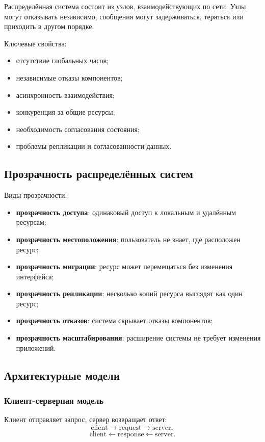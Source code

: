 \documentclass[12pt,a4paper]{article}
\begin{document}
Распределённая система состоит из узлов, взаимодействующих по сети. Узлы могут отказывать независимо, сообщения могут задерживаться, теряться или приходить в другом порядке.

Ключевые свойства:
\begin{itemize}
    \item отсутствие глобальных часов;
    \item независимые отказы компонентов;
    \item асинхронность взаимодействия;
    \item конкуренция за общие ресурсы;
    \item необходимость согласования состояния;
    \item проблемы репликации и согласованности данных.
\end{itemize}

\subsection{Прозрачность распределённых систем}

Виды прозрачности:
\begin{itemize}
    \item \textbf{прозрачность доступа}: одинаковый доступ к локальным и удалённым ресурсам;
    \item \textbf{прозрачность местоположения}: пользователь не знает, где расположен ресурс;
    \item \textbf{прозрачность миграции}: ресурс может перемещаться без изменения интерфейса;
    \item \textbf{прозрачность репликации}: несколько копий ресурса выглядят как один ресурс;
    \item \textbf{прозрачность отказов}: система скрывает отказы компонентов;
    \item \textbf{прозрачность масштабирования}: расширение системы не требует изменения приложений.
\end{itemize}

\subsection{Архитектурные модели}

\subsubsection{Клиент-серверная модель}

Клиент отправляет запрос, сервер возвращает ответ:
\[
\text{client} \rightarrow \text{request} \rightarrow \text{server},
\]
\[
\text{client} \leftarrow \text{response} \leftarrow \text{server}.
\]
\end{document}
